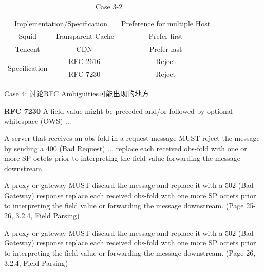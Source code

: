 \begin{table}[!htbp]
	\renewcommand\arraystretch{1}
	\centering
	\begin{tabular}{|c|c|c|}
		\hline
		\multicolumn{2}{|c|}{\multirow{2}{*}{Implementation/Specification}} &
		\multirow{2}{*}{Preference for multiple Host}
		\\ 
		\multicolumn{2}{|c|}{} & 
		\\ \hline
		Squid & Transparent Cache & Prefer first 
		\\ \hline
		Tencent & CDN & Prefer last
		\\ \hline \hline
		\multirow{2}{*}{Specification} & RFC 2616 & Reject
		\\ \cline{2-3}
		& RFC 7230 & Reject
		\\ \hline
	\end{tabular}
\caption{Case 3-2}
\end{table}


Case 4: 讨论RFC Ambiguities可能出现的地方
\begin{spacing}{0.8}
	\begin{tcolorbox}
		\textbf{RFC 7230} A field value might be preceded and/or followed by optional whitespace (OWS) ...
	\end{tcolorbox}
\end{spacing}

\vspace{1ex}

\begin{spacing}{0.8}
	\begin{tcolorbox}
		A server that receives an obs-fold in a request message MUST {\color{red}{either}} reject the message by
		sending a 400 (Bad Request) ... {\color{red}{or}} replace each received obs-fold with one or more SP octets prior to interpreting the field value {\color{red}{or}} forwarding the message downstream.
		
		A proxy or gateway MUST {\color{red}{either}} discard the message and replace it with a 502 (Bad Gateway) response {\color{red}{or}} replace each received obs-fold with one {\color{red}{or}} more SP octets prior to interpreting the field value or forwarding the message downstream.  (Page 25-26, 3.2.4, Field Parsing)
	\end{tcolorbox}
\end{spacing}

\vspace{1ex}

\begin{spacing}{0.8}
	\begin{tcolorbox}
	A proxy or gateway MUST {\color{red}{either}} discard the message and replace it with a 502 (Bad Gateway) response {\color{red}{or}} replace each received obs-fold with one {\color{red}{or}} more SP octets prior to interpreting the field value or forwarding the message downstream.  (Page 26, 3.2.4, Field Parsing)
	\end{tcolorbox}
\end{spacing}